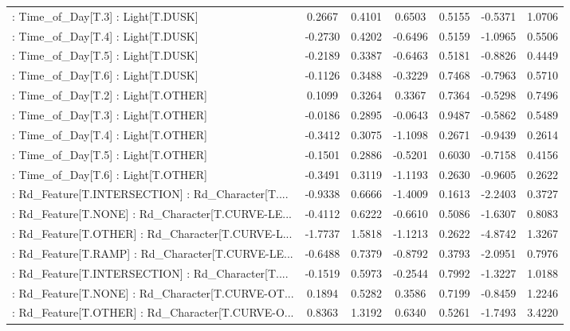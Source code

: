 \begin{longtable}{p{4cm}cccccc}
 : Time\_of\_Day[T.3] : Light[T.DUSK]                &  0.2667 &    0.4101 &  0.6503 &       0.5155 & -0.5371 &  1.0706 \\
 : Time\_of\_Day[T.4] : Light[T.DUSK]                & -0.2730 &    0.4202 & -0.6496 &       0.5159 & -1.0965 &  0.5506 \\
 : Time\_of\_Day[T.5] : Light[T.DUSK]                & -0.2189 &    0.3387 & -0.6463 &       0.5181 & -0.8826 &  0.4449 \\
 : Time\_of\_Day[T.6] : Light[T.DUSK]                & -0.1126 &    0.3488 & -0.3229 &       0.7468 & -0.7963 &  0.5710 \\
 : Time\_of\_Day[T.2] : Light[T.OTHER]               &  0.1099 &    0.3264 &  0.3367 &       0.7364 & -0.5298 &  0.7496 \\
 : Time\_of\_Day[T.3] : Light[T.OTHER]               & -0.0186 &    0.2895 & -0.0643 &       0.9487 & -0.5862 &  0.5489 \\
 : Time\_of\_Day[T.4] : Light[T.OTHER]               & -0.3412 &    0.3075 & -1.1098 &       0.2671 & -0.9439 &  0.2614 \\
 : Time\_of\_Day[T.5] : Light[T.OTHER]               & -0.1501 &    0.2886 & -0.5201 &       0.6030 & -0.7158 &  0.4156 \\
 : Time\_of\_Day[T.6] : Light[T.OTHER]               & -0.3491 &    0.3119 & -1.1193 &       0.2630 & -0.9605 &  0.2622 \\
 : Rd\_Feature[T.INTERSECTION] : Rd\_Character[T.... & -0.9338 &    0.6666 & -1.4009 &       0.1613 & -2.2403 &  0.3727 \\
 : Rd\_Feature[T.NONE] : Rd\_Character[T.CURVE-LE... & -0.4112 &    0.6222 & -0.6610 &       0.5086 & -1.6307 &  0.8083 \\
 : Rd\_Feature[T.OTHER] : Rd\_Character[T.CURVE-L... & -1.7737 &    1.5818 & -1.1213 &       0.2622 & -4.8742 &  1.3267 \\
 : Rd\_Feature[T.RAMP] : Rd\_Character[T.CURVE-LE... & -0.6488 &    0.7379 & -0.8792 &       0.3793 & -2.0951 &  0.7976 \\
 : Rd\_Feature[T.INTERSECTION] : Rd\_Character[T.... & -0.1519 &    0.5973 & -0.2544 &       0.7992 & -1.3227 &  1.0188 \\
 : Rd\_Feature[T.NONE] : Rd\_Character[T.CURVE-OT... &  0.1894 &    0.5282 &  0.3586 &       0.7199 & -0.8459 &  1.2246 \\
 : Rd\_Feature[T.OTHER] : Rd\_Character[T.CURVE-O... &  0.8363 &    1.3192 &  0.6340 &       0.5261 & -1.7493 &  3.4220 \\

\end{longtable}
